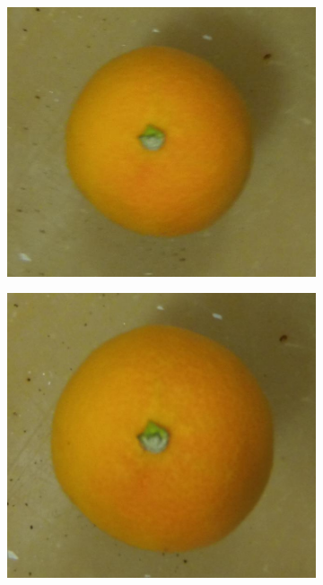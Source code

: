\documentclass {udthesis}
\begin{document}
\begin{figure}
\begin{subfigure}[]{0.12\textwidth}
      \caption{}
  \end{subfigure}
  \begin{subfigure}[]{0.12\textwidth}
      \includegraphics[width=\textwidth]{orange4_obj_11/orange4_011_12}
      \caption{}
  \end{subfigure}
  \begin{subfigure}[]{0.12\textwidth}
      \includegraphics[width=\textwidth]{orange4_obj_11/orange4_011_10}

\end{subfigure}
\end{figure}
\end{document}
